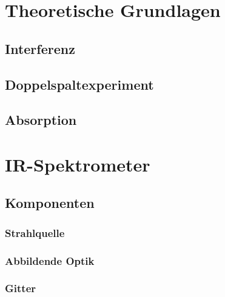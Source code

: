 \documentclass{article}
\begin{document}



\section{Theoretische Grundlagen}


\subsection{Interferenz}


\subsection{Doppelspaltexperiment}


\subsection{Absorption}


\section{IR-Spektrometer}


\subsection{Komponenten}

\subsubsection{Strahlquelle}


\subsubsection{Abbildende Optik}


\subsubsection{Gitter}
\end{document}
